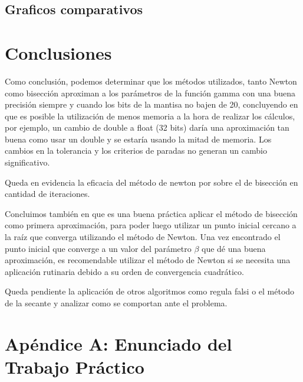 \documentclass[a4paper,10pt,twoside]{article}
\begin{document}
\subsection{Graficos comparativos}




\section{Conclusiones}

Como conclusión, podemos determinar que los métodos utilizados, tanto Newton como bisección aproximan a los parámetros de la función gamma con una buena precisión siempre y cuando los bits de la mantisa no bajen de 20, concluyendo en que es posible la utilización de menos memoria a la hora de realizar los cálculos, por ejemplo, un cambio de double a float (32 bits) daría una aproximación tan buena como usar un double y se estaría usando la mitad de memoria. Los cambios en la tolerancia y los criterios de paradas no generan un cambio significativo.

Queda en evidencia la eficacia del método de newton por sobre el de bisección en cantidad de iteraciones.

Concluimos también en que es una buena práctica aplicar el método de bisección como primera aproximación, para poder luego utilizar un punto inicial cercano a la raíz que converga utilizando el método de Newton. Una vez encontrado el punto inicial que converge a un valor del parámetro $\beta$ que dé una buena aproximación, es recomendable utilizar el método de Newton si se necesita una aplicación rutinaria debido a su orden de convergencia cuadrático.

Queda pendiente la aplicación de otros algoritmos como regula falsi o el método de la secante y analizar como se comportan ante el problema.




\section{Apéndice A: Enunciado del Trabajo Práctico}
\end{document}
